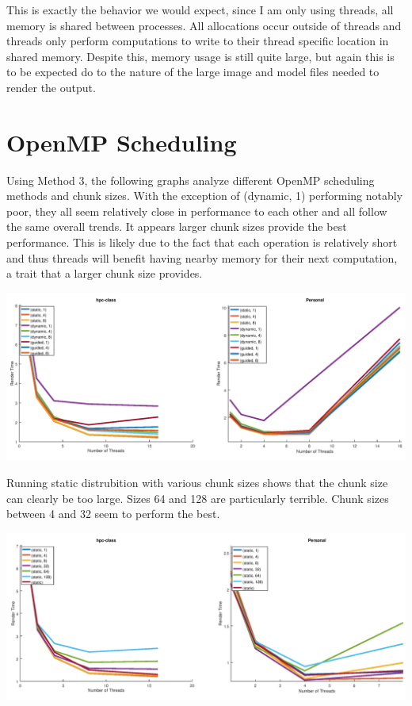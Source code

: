 \documentclass[12pt]{article}
\begin{document}
This is exactly the behavior we would expect, since I am only using threads, all memory is shared
between processes. All allocations occur outside of threads and threads only perform computations
to write to their thread specific location in shared memory. Despite this, memory usage is still quite
large, but again this is to be expected do to the nature of the large image and model files needed
to render the output.

\section*{OpenMP Scheduling}

Using Method 3, the following graphs analyze different OpenMP scheduling methods and chunk sizes.
With the exception of (dynamic, 1) performing notably poor, 
they all seem relatively close in performance
to each other and all follow the same overall trends. 
It appears larger chunk sizes provide the best performance.
This is likely due to the fact that each operation is relatively short 
and thus threads will benefit having
nearby memory for their next computation, a trait that a larger chunk size provides.
\begin{center}
	\includegraphics[width=\textwidth]{scheduling.png}
\end{center}
\clearpage
Running static distrubition with various chunk sizes shows that the chunk size can clearly be too large.
Sizes 64 and 128 are particularly terrible. Chunk sizes between 4 and 32 seem to perform the best.
\begin{center}
	\includegraphics[width=\textwidth]{chunksize.png}
\end{center}
\end{document}
